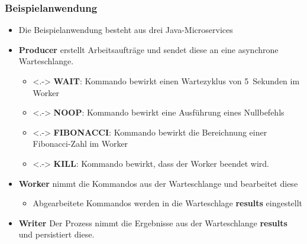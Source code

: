 \begin{frame}
\frametitle{Beispielanwendung}
\begin{itemize}
	\item Die Beispielanwendung besteht aus drei Java-Microservices
	\pause
	\item \textbf{Producer} erstellt Arbeitsaufträge und sendet diese an eine asynchrone Warteschlange. 
	\begin{itemize}
		\item<.-> \textbf{WAIT}: Kommando bewirkt einen Wartezyklus von 5~Sekunden im Worker
		\item<.-> \textbf{NOOP}: Kommando bewirkt eine Ausführung eines Nullbefehls
		\item<.-> \textbf{FIBONACCI}: Kommando bewirkt die Bereichnung einer Fibonacci-Zahl im Worker
		\item<.-> \textbf{KILL}: Kommando bewirkt, dass der Worker beendet wird.  
	\end{itemize}
	\pause
	\item \textbf{Worker} nimmt die Kommandos aus der Warteschlange und bearbeitet diese
	\begin{itemize}
		\item Abgearbeitete Kommandos werden in die Warteschlage \textbf{results} eingestellt 
	\end{itemize}
	\item \textbf{Writer} Der Prozess nimmt die Ergebnisse aus der Warteschlange \textbf{results} und persistiert diese.
\end{itemize}
\end{frame}
